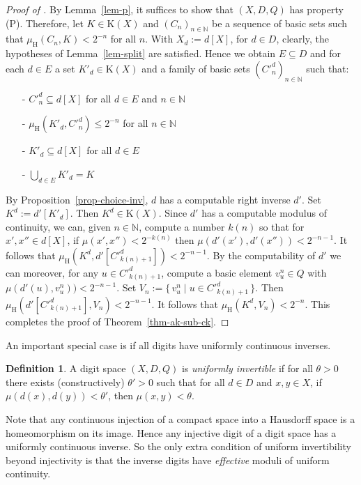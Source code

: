 \documentclass[microtype]{jloganal}
\theoremstyle{plain}
\theoremstyle{definition}
\newtheorem{definition}[theorem]{Definition}
\newcommand{\NN}{\mathbb{N}}
\newcommand{\compact}{\mathrm{K}}
\newcommand{\hdm}{\mu_{\mathrm H}}
\newcommand{\set}[2]{\mbox{$\{\,#1 \mid #2 \,\}$}}
\begin{document}
\begin{proof}[Proof of ]
 By Lemma~\ref{lem-p}, it suffices
to show that $(X,D,Q)$ has property (P). 
Therefore, let $K \in \compact(X)$ and $(C_n)_{n\in\NN}$ be a sequence of 
basic sets such that $\hdm(C_n,K) < 2^{-n}$ for all $n$. With
$X_d:= d[X]$, for $d \in D$, clearly, the hypotheses of Lemma~\ref{lem-split}
are satisfied. Hence we obtain $E\subseteq D$ and for each $d\in E$ a set 
$K'_d\in\compact(X)$ and a family of basic sets $(C'^d_n)_{n\in\NN}$
such that:
\begin{itemize}
\item[-] $C'^d_n\subseteq d[X]$ for all $d\in E$ and $n\in\NN$
\item[-] $\hdm(K'_d,C'^d_n)\le 2^{-n}$ for all $n\in\NN$
\item[-] $K'_d\subseteq d[X]$ for all $d\in E$
\item[-] $\bigcup_{d\in E} K'_d = K$
\end{itemize}
By Proposition~\ref{prop-choice-inv}, $d$ has a computable right inverse $d'$. Set $K^d := d'[K'_d]$. Then $K^d \in \compact(X)$. Since $d'$ has a computable modulus of continuity, we can, given $n \in \NN$, compute a number $k(n)$ so that for $x', x'' \in d[X]$, if $\mu(x', x'') < 2^{-k(n)}$ then $\mu(d'(x'), d'(x'')) < 2^{-n-1}$. It follows that $\hdm(K^d, d'[C'^d_{k(n)+1}]) < 2^{-n-1}$. By the computability of $d'$
we can moreover, for any $u \in C'^d_{k(n)+1}$, compute a basic element $v^n_u \in Q$ with $\mu(d'(u), v^n_u)) < 2^{-n-1}$.
Set $V_n := \set{v^n_u}{u \in C'^d_{k(n)+1}}$. Then $\hdm(d'[C'^d_{k(n)+1}], V_n) < 2^{-n-1}$. It follows that $\hdm(K^d, V_n) < 2^{-n}$. This completes the proof of Theorem~\ref{thm-ak-sub-ck}.
\end{proof}
 
 An important special case is if all digits have uniformly continuous inverses.
 
 \begin{definition}
 \label{def-unifinv}
 A digit space $(X, D,Q)$ is \emph{uniformly invertible} if for all $\theta > 0$ there exists (constructively) $\theta' > 0$ such that for all $d \in D$ and $x, y \in X$, if $\mu(d(x), d(y)) < \theta'$, then $\mu(x, y) < \theta$.
 \end{definition}
 
Note that any continuous injection of a compact space into a 
Hausdorff space is a homeomorphism on its image. Hence any injective
digit of a digit space has a uniformly continuous inverse. So the
only extra condition of uniform invertibility beyond injectivity is that
the inverse digits have \emph{effective} moduli of uniform continuity.
\end{document}
